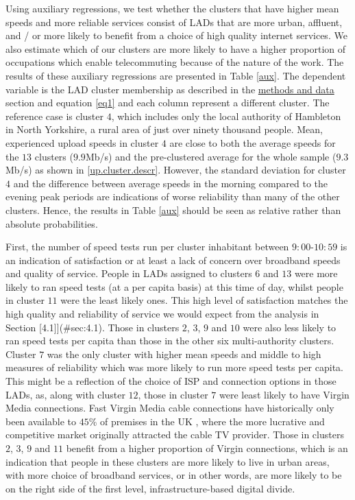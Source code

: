 \documentclass[Royal,times,sageh]{sagej}
\begin{document}
Using auxiliary regressions, we test whether the clusters that have
higher mean speeds and more reliable services consist of LADs that are
more urban, affluent, and / or more likely to benefit from a choice of
high quality internet services. We also estimate which of our clusters
are more likely to have a higher proportion of occupations which enable
telecommuting because of the nature of the work. The results of these
auxiliary regressions are presented in Table \ref{aux}. The dependent
variable is the LAD cluster membership as described in the
\protect\hyperlink{sec:3}{methods and data} section and equation
\ref{eq1} and each column represent a different cluster. The reference
case is cluster \(4\), which includes only the local authority of
Hambleton in North Yorkshire, a rural area of just over ninety thousand
people. Mean, experienced upload speeds in cluster \(4\) are close to
both the average speeds for the \(13\) clusters (\(9.9\)Mb/s) and the
pre-clustered average for the whole sample (\(9.3\)Mb/s) as shown in
\ref{up.cluster.descr}. However, the standard deviation for cluster
\(4\) and the difference between average speeds in the morning compared
to the evening peak periods are indications of worse reliability than
many of the other clusters. Hence, the results in Table \ref{aux} should
be seen as relative rather than absolute probabilities.

First, the number of speed tests run per cluster inhabitant between
\(9:00\)-\(10:59\) is an indication of satisfaction or at least a lack
of concern over broadband speeds and quality of service. People in LADs
assigned to clusters \(6\) and \(13\) were more likely to ran speed
tests (at a per capita basis) at this time of day, whilst people in
cluster \(11\) were the least likely ones. This high level of
satisfaction matches the high quality and reliability of service we
would expect from the analysis in Section {[}4.1{]}{]}(\#sec:4.1). Those
in clusters \(2\), \(3\), \(9\) and \(10\) were also less likely to ran
speed tests per capita than those in the other six multi-authority
clusters. Cluster \(7\) was the only cluster with higher mean speeds and
middle to high measures of reliability which was more likely to run more
speed tests per capita. This might be a reflection of the choice of ISP
and connection options in those LADs, as, along with cluster \(12\),
those in cluster \(7\) were least likely to have Virgin Media
connections. Fast Virgin Media cable connections have historically only
been available to \(45\)\% of premises in the UK \citep{ofcom2016},
where the more lucrative and competitive market originally attracted the
cable TV provider. Those in clusters \(2\), \(3\), \(9\) and \(11\)
benefit from a higher proportion of Virgin connections, which is an
indication that people in these clusters are more likely to live in
urban areas, with more choice of broadband services, or in other words,
are more likely to be on the right side of the first level,
infrastructure-based digital divide.
\end{document}
